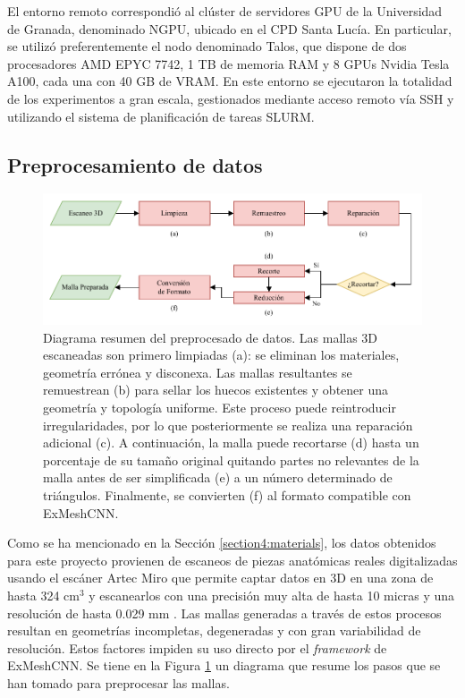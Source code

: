 El entorno remoto correspondió al clúster de servidores GPU de la Universidad de Granada, denominado NGPU, ubicado en el CPD Santa Lucía. En particular, se utilizó preferentemente el nodo denominado Talos, que dispone de dos procesadores AMD EPYC 7742, 1 TB de memoria RAM y 8 GPUs Nvidia Tesla A100, cada una con 40 GB de VRAM. En este entorno se ejecutaron la totalidad de los experimentos a gran escala, gestionados mediante acceso remoto vía SSH y utilizando el sistema de planificación de tareas SLURM.

\subsection{Preprocesamiento de datos}

\begin{figure}[h]
    \includegraphics[width=\linewidth]{figures/4_materials-methods/mesh_preparation_pipeline.pdf}
    \caption[Diagrama resumen del preprocesado de datos]{Diagrama resumen del preprocesado de datos. Las mallas 3D escaneadas son primero limpiadas (a): se eliminan los materiales, geometría errónea y disconexa. Las mallas resultantes se remuestrean (b) para sellar los huecos existentes y obtener una geometría y topología uniforme. Este proceso puede reintroducir irregularidades, por lo que posteriormente se realiza una reparación adicional (c). A continuación, la malla puede recortarse (d) hasta un porcentaje de su tamaño original quitando partes no relevantes de la malla antes de ser simplificada (e) a un número determinado de triángulos. Finalmente, se convierten (f) al formato compatible con ExMeshCNN.}
    \label{mesh_preparation_pipeline}
\end{figure}

Como se ha mencionado en la Sección \ref{section4:materials}, los datos obtenidos para este proyecto provienen de escaneos de piezas anatómicas reales digitalizadas usando el escáner Artec Miro que permite captar datos en 3D en una zona de hasta 324 cm$^3$ y escanearlos con una precisión muy alta de hasta 10 micras y una resolución de hasta 0.029 mm \cite{artec_data}. Las mallas generadas a través de estos procesos resultan en geometrías incompletas, degeneradas y con gran variabilidad de resolución. Estos factores impiden su uso directo por el \textit{framework} de ExMeshCNN. Se tiene en la Figura \ref{mesh_preparation_pipeline} un diagrama que resume los pasos que se han tomado para preprocesar las mallas.

